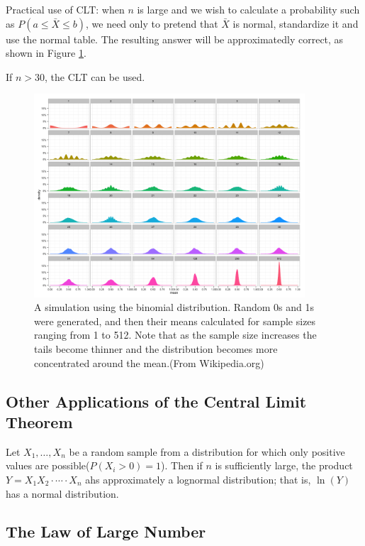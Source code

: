 Practical use of CLT: when $n$ is large and we wish to calculate a probability such as $P(a\leq \bar{X}\leq b)$, we need only to pretend that $\bar{X}$ is normal, standardize it and use the normal table. The resulting answer will be approximatedly correct, as shown in Figure \ref{fig:6-1}.

If $n>30$, the CLT can be used.

\begin{figure}[H]
    \centering
    \includegraphics[width=0.9\textwidth]{img/6-central-limit-theorem.png}
    \caption{A simulation using the binomial distribution. Random 0s and 1s were generated, and then their means calculated for sample sizes ranging from 1 to 512. Note that as the sample size increases the tails become thinner and the distribution becomes more concentrated around the mean.(From Wikipedia.org)}
    \label{fig:6-1}
\end{figure}

\subsection{Other Applications of the Central Limit Theorem}

\begin{proposition}
    Let $X_1,\dots,X_n$ be a random sample from a distribution for which only positive values are possible($P(X_i > 0) = 1$). Then if $n$ is sufficiently large, the product $Y=X_1X_2\cdot\cdots\cdot X_n$ ahs approximately a lognormal distribution; that is, $\ln(Y)$ has a normal distribution.
\end{proposition}

\subsection{The Law of Large Number}